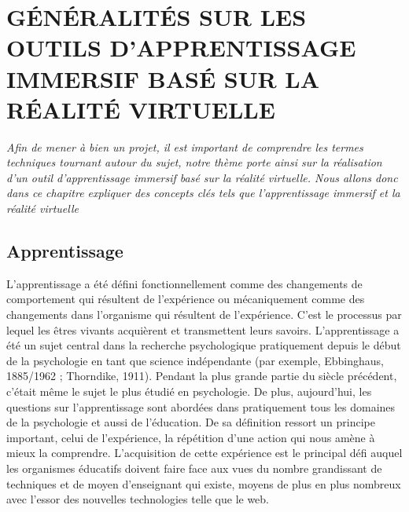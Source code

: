 


\chapter{GÉNÉRALITÉS SUR LES OUTILS D'APPRENTISSAGE IMMERSIF BASÉ SUR LA RÉALITÉ VIRTUELLE}


\textit{Afin de mener à bien un projet, il est important de comprendre les termes techniques tournant autour du sujet, notre thème porte ainsi sur la réalisation d'un outil d'apprentissage immersif basé sur la réalité virtuelle. Nous allons donc dans ce chapitre expliquer des concepts clés tels que l'apprentissage immersif et la réalité virtuelle}
\clearpage

\section{Apprentissage}

L'apprentissage a été défini fonctionnellement comme des changements de comportement qui résultent de l'expérience ou mécaniquement comme des changements dans l'organisme qui résultent de l'expérience\cite{deHouwer2013WhatIL}.
C'est le processus par lequel les êtres vivants acquièrent et transmettent leurs savoirs.
L'apprentissage a été un sujet central dans la recherche psychologique pratiquement depuis le début de la psychologie
en tant que science indépendante (par exemple, Ebbinghaus, 1885/1962 ; Thorndike, 1911).
Pendant la plus grande partie du siècle précédent, c'était même le sujet le plus étudié en psychologie.
De plus, aujourd'hui, les questions sur l'apprentissage sont abordées dans pratiquement tous les domaines de la psychologie et aussi de l'éducation\cite{deHouwer2013WhatIL}.
De sa définition ressort un principe important, celui de l'expérience, la répétition d'une action qui nous amène à mieux la comprendre.
L'acquisition de cette expérience est le principal défi auquel les organismes éducatifs doivent faire face aux vues du nombre grandissant de techniques et de moyen d'enseignant qui existe, moyens de plus en plus nombreux avec
l'essor des nouvelles technologies telle que le web.


